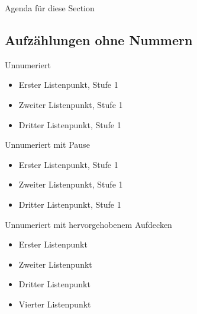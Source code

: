 	\begin{frame}{Agenda für diese Section}
		\tableofcontents[currentsection]
	\end{frame}


	\subsection{Aufzählungen ohne Nummern}

	\begin{frame}{Unnumeriert}
		\begin{itemize}
			\item Erster Listenpunkt, Stufe 1
			\item Zweiter Listenpunkt, Stufe 1
			\item Dritter Listenpunkt, Stufe 1
		\end{itemize}
	\end{frame}


	\begin{frame}{Unnumeriert mit Pause}
		\begin{itemize}
			\item Erster Listenpunkt, Stufe 1
				\pause
			\item Zweiter Listenpunkt, Stufe 1
				\pause
			\item Dritter Listenpunkt, Stufe 1
		\end{itemize}
	\end{frame}


	\begin{frame}{Unnumeriert mit hervorgehobenem Aufdecken}
		\begin{itemize}
			\item<+-| alert@+> Erster Listenpunkt
			\item<+-| alert@+> Zweiter Listenpunkt
			\item<+-| alert@+> Dritter Listenpunkt
			\item<+-| alert@+> Vierter Listenpunkt
		\end{itemize}
	\end{frame}


